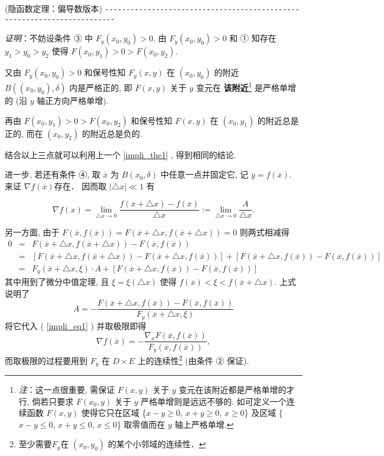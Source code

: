 \begin{theorem}{(隐函数定理：偏导数版本)}
\verb|------------------------------------------------------------------------|

\textsl{证明}：不妨设条件 ③ 中 $F_{y}(x_{0},y_{0})>0.$ 由 $F_{y}(x_{0},y_{0})>0$ 和
① 知存在 $y_{1}>y_{0}>y_{2}$ 使得 $F(x_{0},y_{1})>0>F(x_{0},y_{2})$. 

又由 $F_{y}(x_{0},y_{0})>0$ 和保号性知 $F_{y}(x,y)$ 在 $(x_{0},y_{0})$
的附近 $B((x_{0},y_{0}),\delta)$ 内是严格正的, 即 $F(x,y)$ 关于 $y$ 变元在 \textbf{该附近}\footnote{\textsl{注}：这一点很重要, 需保证 $F(x,y)$ 关于 $y$ 变元在该附近都是严格单增的才行, 倘若只要求 $F(x_{0},y)$
关于 $y$ 严格单增则是远远不够的. 如可定义一个连续函数 $F(x,y)$ 使得它只在区域 \{$x-y\geqslant0$,
$x+y\geqslant0$, $x\geqslant0$\} 及区域 \{$x-y\leqslant0$, $x+y\leqslant0$,
$x\leqslant0$\} 取零值而在 $y$ 轴上严格单增. } 是严格单增的 (沿 $y$ 轴正方向严格单增). 

再由 $F(x_{0},y_{1})>0>F(x_{0},y_{2})$ 和保号性知 $F(x,y)$ 在 $(x_{0},y_{1})$
的附近总是正的, 而在 $(x_{0},y_{2})$ 的附近总是负的. 

结合以上三点就可以利用上一个 \autoref{impli_the1} , 得到相同的结论. 

进一步, 若还有条件 ④, 取 \textbf{$\overline{x}$ }为 $B(x_{0},\delta)$ 中任意一点并固定它,
记 $\overline{y}=f(\overline{x})$. 来证 $\nabla f(\overline{x})$存在． 因而取 $\left|\triangle x\right|\ll1$
有

\begin{equation}\label{impli_eq1}
\nabla f(x)={\displaystyle {\displaystyle \lim_{\triangle x\rightarrow0}}\frac{f(\overline{x}+\triangle x)-f(\overline{x})}{\triangle x}:={\displaystyle \lim_{\triangle x\rightarrow0}}\frac{A}{\triangle x}}.
\end{equation}

另一方面, 由于 $F(\overline{x},f(\overline{x}))=F(\overline{x}+\triangle x,f(\overline{x}+\triangle x))=0$
则两式相减得
$$
\begin{eqnarray*}
0 & = & F(\overline{x}+\triangle x,f(\overline{x}+\triangle x))-F(\overline{x},f(\overline{x}))\\
 & = & \left[F(\overline{x}+\triangle x,f(\overline{x}+\triangle x))-F(\overline{x}+\triangle x,f(\overline{x}))\right]+\left[F(\overline{x}+\triangle x,f(\overline{x}))-F(\overline{x},f(\overline{x}))\right]\\
 & = & F_{y}(\overline{x}+\triangle x,\xi)\cdot A+\left[F(\overline{x}+\triangle x,f(\overline{x}))-F(\overline{x},f(\overline{x}))\right]
\end{eqnarray*}
$$
其中用到了微分中值定理, 且 $\xi=\xi(\triangle x)$ 使得 $f(\overline{x})<\xi<f(\overline{x}+\triangle x)$.
上式说明了 
\[
A=-{\displaystyle \frac{F(\overline{x}+\triangle x,f(\overline{x}))-F(\overline{x},f(\overline{x}))}{F_{y}(\overline{x}+\triangle x,\xi)}}
\]
将它代入 ( \autoref{impli_eq1} ) 并取极限即得 
\begin{equation}\label{impli_eq2}
\nabla f(\overline{x})=-{\displaystyle \frac{\nabla_{x}F(\overline{x},f(\overline{x}))}{F_{y}(\overline{x},f(\overline{x}))},}
\end{equation}
而取极限的过程要用到 $F_{y}$ 在 $D\times E$ 上的连续性\footnote{至少需要$F_y$在 $(x_0,y_0)$ 的某个小邻域的连续性．} (由条件 ② 保证). 


\end{theorem}
